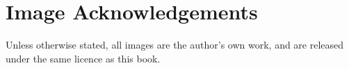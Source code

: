\chapter{Image Acknowledgements}
Unless otherwise stated, all images are the author's own work, and are released under the same licence as this book.

\printbibliography[heading=bibintoc, title={References and Bibliography}]
\printindex
